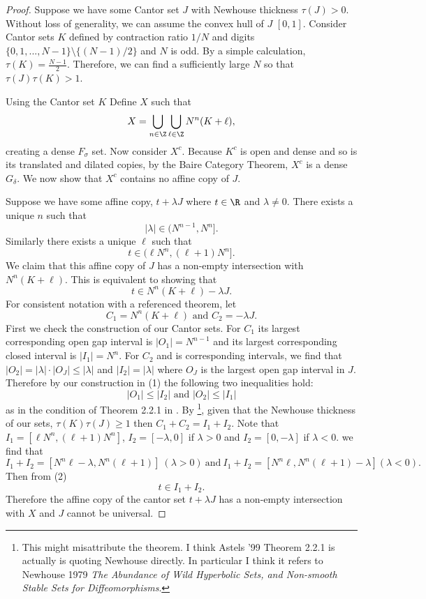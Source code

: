 \begin{proof} Suppose we have some Cantor set $J$ with Newhouse thickness $\tau(J) >0$. Without loss of generality, we  can assume  the convex hull of $J$ $[0,1]$.   Consider Cantor sets $K$ defined by contraction ratio $1/N$ and digits $\{0,1,...,N-1\}\setminus\{(N-1)/2\}$ and $N$ is odd. By a simple calculation,  $\tau (K) = \frac{N-1}{2}$. Therefore,  we can find a  sufficiently large $N$ so that $\tau(J)\tau(K)>1$. 

\medskip

Using the Cantor set $K$ Define $X$ such that $$
X = \bigcup_{n \in \Z} \bigcup_{\ell \in \Z} N^n(K+\ell),
$$creating a dense $F_\sigma$ set. Now consider $X^c$.  Because $K^c$ is open and dense and so is its translated and dilated copies, by the Baire Category Theorem, $X^c$ is a dense $G_{\delta}$.  We now show that $X^c$ contains no affine copy of $J$. 

\medskip

Suppose we have some affine copy, $t+ \lambda J$ where $t\in\R$ and $\lambda\ne 0$. There exists a unique $n$ such that 
\begin{equation}
    |\lambda| \in (N^{n-1}, N^n].
\end{equation}
Similarly there exists a unique $\ell$ such that 
\begin{equation}
t \in (\ell  N^n, (\ell+1)N^n].    
\end{equation}
We claim that this affine copy of $J$ has a non-empty intersection with $N^n(K+\ell)$.  This is equivalent to  showing that 
$$t \in N^n(K+\ell)-\lambda J.$$
For consistent notation with a referenced theorem, let 
$$C_1 = N^n(K+\ell) \text{ and } C_2 = - \lambda J.$$
First we check the construction of our Cantor sets. For $C_1$ its largest corresponding open gap interval is $|O_1| = N^{n-1}$ and its largest corresponding closed interval is $|I_1| = N^n$. For $C_2$ and is corresponding intervals, we find that $|O_2| =|\lambda|\cdot |O_J| \le |\lambda|$ and $|I_2| = |\lambda|$ where $O_J$ is the largest  open gap interval in $J$.  Therefore by our construction in (1) the following two inequalities hold: $$|O_1|\leq |I_2| \text { and } |O_2| \leq |I_1|$$ as in the condition of Theorem 2.2.1 in \cite{Astels}.  By \cite [Theorem 2.2.1]{Astels}\footnote{This might misattribute the theorem.  I think Astels '99 Theorem 2.2.1 is  actually is quoting Newhouse directly.  In particular I think it refers to Newhouse 1979 \cite{PMIHES_1979__50__101_0} \textit{The Abundance of Wild Hyperbolic Sets, and Non-smooth Stable Sets for Diffeomorphisms}. }, given that the Newhouse thickness of our sets, $\tau(K)\tau(J) \geq 1$ then $C_1 + C_2 = I_1 + I_2$. Note that   $I_1 = [\ell N^n, (\ell+1)N^n]$,  $I_2=[-\lambda, 0]$ if $\lambda>0$  and $I_2=[0,-\lambda]$ if $\lambda<0$.  we find that 
$$
I_1+ I_2 = [N^n\ell - \lambda, N^n(\ell+1)] \  (\lambda>0) \ \mbox{and} \ I_1+I_2 = [N^n\ell, N^n(\ell+1)-\lambda] (\lambda<0).
$$
Then from (2)
$$t \in I_1+I_2.$$
Therefore the affine copy of the cantor set $t + \lambda J$ has a non-empty intersection with $X$ and $J$ cannot be universal.

\end{proof}

